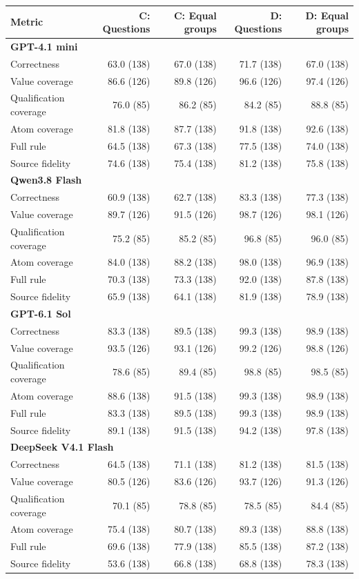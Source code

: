 \begin{tabular}{lrrrr}
\toprule
Metric & C: Questions & C: Equal groups & D: Questions & D: Equal groups \\
\midrule
\multicolumn{5}{l}{\textbf{GPT-4.1 mini}} \\
Correctness & 63.0 (138) & 67.0 (138) & 71.7 (138) & 67.0 (138) \\
Value coverage & 86.6 (126) & 89.8 (126) & 96.6 (126) & 97.4 (126) \\
Qualification coverage & 76.0 (85) & 86.2 (85) & 84.2 (85) & 88.8 (85) \\
Atom coverage & 81.8 (138) & 87.7 (138) & 91.8 (138) & 92.6 (138) \\
Full rule & 64.5 (138) & 67.3 (138) & 77.5 (138) & 74.0 (138) \\
Source fidelity & 74.6 (138) & 75.4 (138) & 81.2 (138) & 75.8 (138) \\
\multicolumn{5}{l}{\textbf{Qwen3.8 Flash}} \\
Correctness & 60.9 (138) & 62.7 (138) & 83.3 (138) & 77.3 (138) \\
Value coverage & 89.7 (126) & 91.5 (126) & 98.7 (126) & 98.1 (126) \\
Qualification coverage & 75.2 (85) & 85.2 (85) & 96.8 (85) & 96.0 (85) \\
Atom coverage & 84.0 (138) & 88.2 (138) & 98.0 (138) & 96.9 (138) \\
Full rule & 70.3 (138) & 73.3 (138) & 92.0 (138) & 87.8 (138) \\
Source fidelity & 65.9 (138) & 64.1 (138) & 81.9 (138) & 78.9 (138) \\
\multicolumn{5}{l}{\textbf{GPT-6.1 Sol}} \\
Correctness & 83.3 (138) & 89.5 (138) & 99.3 (138) & 98.9 (138) \\
Value coverage & 93.5 (126) & 93.1 (126) & 99.2 (126) & 98.8 (126) \\
Qualification coverage & 78.6 (85) & 89.4 (85) & 98.8 (85) & 98.5 (85) \\
Atom coverage & 88.6 (138) & 91.5 (138) & 99.3 (138) & 98.9 (138) \\
Full rule & 83.3 (138) & 89.5 (138) & 99.3 (138) & 98.9 (138) \\
Source fidelity & 89.1 (138) & 91.5 (138) & 94.2 (138) & 97.8 (138) \\
\multicolumn{5}{l}{\textbf{DeepSeek V4.1 Flash}} \\
Correctness & 64.5 (138) & 71.1 (138) & 81.2 (138) & 81.5 (138) \\
Value coverage & 80.5 (126) & 83.6 (126) & 93.7 (126) & 91.3 (126) \\
Qualification coverage & 70.1 (85) & 78.8 (85) & 78.5 (85) & 84.4 (85) \\
Atom coverage & 75.4 (138) & 80.7 (138) & 89.3 (138) & 88.8 (138) \\
Full rule & 69.6 (138) & 77.9 (138) & 85.5 (138) & 87.2 (138) \\
Source fidelity & 53.6 (138) & 66.8 (138) & 68.8 (138) & 78.3 (138) \\
\bottomrule
\end{tabular}
